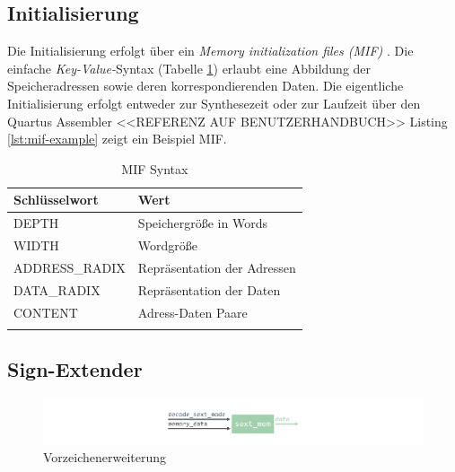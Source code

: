         \subsection{Initialisierung}\label{lab:mif}
            Die Initialisierung erfolgt über ein \textit{Memory initialization files (MIF)} \cite{intel-mif}.
            Die einfache \textit{Key-Value-}Syntax (Tabelle \ref{tab:mif-syntax}) erlaubt eine Abbildung der Speicheradressen sowie deren korrespondierenden Daten.
            Die eigentliche Initialisierung erfolgt entweder zur Synthesezeit oder zur Laufzeit über den Quartus Assembler <<REFERENZ AUF BENUTZERHANDBUCH>>
            Listing \ref{lst:mif-example} zeigt ein Beispiel MIF.
            \begin{center}
                \begin{longtable}{| l | l |}
                    \hline
                        Schlüsselwort & Wert\\
                    \hline
                        DEPTH & Speichergröße in Words\\
                    \hline
                        WIDTH & Wordgröße\\
                    \hline
                        ADDRESS\_RADIX & Repräsentation der Adressen\\
                    \hline
                        DATA\_RADIX & Repräsentation der Daten\\
                    \hline
                        CONTENT & Adress-Daten Paare\\
                    \hline
                    \caption[MIF Syntax]{MIF Syntax}
                    \label{tab:mif-syntax}
                \end{longtable}
            \end{center}

            


        \subsection{Sign-Extender}

            \begin{figure}[H]
                \centering
                \includegraphics[scale=1]{img/block_sext.pdf}
                \caption{Vorzeichenerweiterung}
                \label{fig:sext}
            \end{figure}

